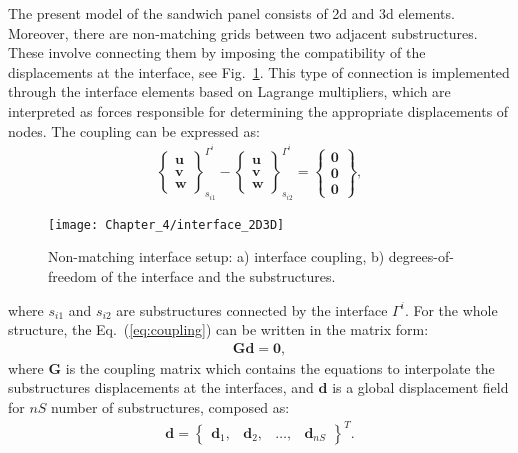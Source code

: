\documentclass[11pt,a4paper,final]{report}
\begin{document}
The present model of the sandwich panel consists of \ac{2d} and \ac{3d} elements. 
Moreover, there are non-matching grids between two adjacent substructures. 
These involve connecting them by imposing the compatibility of the displacements at the interface, see Fig.~\ref{fig:interface}.
This type of connection is implemented through the interface elements based on Lagrange multipliers, which are interpreted as forces responsible for determining the appropriate displacements of nodes.
The coupling can be expressed as:
\begin{eqnarray}
	\left\{\begin{array}{c}
		\textbf{u}\\
		\textbf{v}\\
		\textbf{w}
	\end{array}\right\}_{s_{i1}}^{\Gamma^i}-
	\left\{\begin{array}{c}
		\textbf{u}\\
		\textbf{v}\\
		\textbf{w}
	\end{array}\right\}_{s_{i2}}^{\Gamma^i}=
	\left\{\begin{array}{c}
		\textbf{0}\\
		\textbf{0}\\
		\textbf{0}
	\end{array}\right\},
	\label{eq:coupling}
\end{eqnarray}
\begin{figure}
	\begin{center}
		\texttt{[image: Chapter\_4/interface\_2D3D]}
	\end{center}
	\caption{Non-matching interface setup: a) interface coupling, b) degrees-of-freedom of the interface and the substructures.}
	\label{fig:interface}
\end{figure}
where \(s_{i1}\) and \(s_{i2}\) are substructures connected by the interface \(\Gamma^i\). For the whole structure, the Eq.~(\ref{eq:coupling}) can be written in the matrix form:
\begin{eqnarray}
	\textbf{G}\textbf{d}=\textbf{0},
	\label{eq:cond_disp}
\end{eqnarray}
where \textbf{G} is the coupling matrix which contains the equations to interpolate the substructures displacements at the interfaces, and \(\textbf{d}\) is a global displacement field for \(nS\) number of substructures, composed as:
\begin{eqnarray}
	\textbf{d} = \left\{\begin{array}{cccc}
		\textbf{d}_1, & \textbf{d}_2, &\ldots, & \textbf{d}_{nS}
	\end{array}\right\}^T.
	\label{eq:displacements}
\end{eqnarray}
\end{document}
